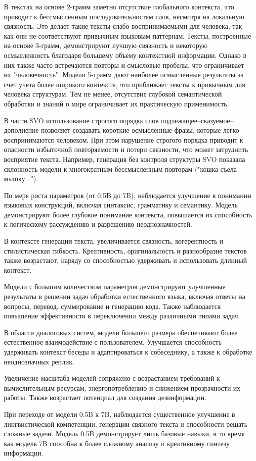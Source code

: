 В текстах на основе 2-грамм заметно отсутствие глобального контекста, что приводит к бессмысленным последовательностям слов, несмотря на локальную связность. 
Это делает такие тексты слабо воспринимаемыми для человека, так как они не соответствуют привычным языковым паттернам.
Тексты, построенные на основе 3-грамм, демонстрируют лучшую связность и некоторую осмысленность благодаря большему объему контекстной информации. 
Однако в них также часто встречаются повторы и смысловые пробелы, что ограничивает их "человечность". 
Модели 5-грамм дают наиболее осмысленные результаты за счет учета более широкого контекста, что приближает тексты к привычным для человека структурам. 
Тем не менее, отсутствие глубокой семантической обработки и знаний о мире ограничивает их практическую применимость.

В части SVO использование строгого порядка слов подлежащее–сказуемое–дополнение позволяет создавать короткие осмысленные фразы, которые легко воспринимаются человеком. 
При этом нарушение строгого порядка приводит к опасности избыточной повторяемости и потери связности, что может затруднить восприятие текста. 
Например, генерация без контроля структуры SVO показала склонность модели к многократным бессмысленным повторам ("кошка съела мышку..."). 

По мере роста параметров (от 0.5B до 7B), наблюдается улучшение в понимании языковых конструкций, включая синтаксис, грамматику и семантику. 
Модель демонстрируют более глубокое понимание контекста, повышается их способность к логическому рассуждению и разрешению неоднозначностей.

В контексте генерации текста, увеличивается связность, когерентность и стилистическая гибкость. 
Креативность, оригинальность и разнообразие текстов также возрастают, наряду со способностью удерживать и использовать длинный контекст.

Модели с большим количеством параметров демонстрируют улучшенные результаты в решении задач обработки естественного языка, 
включая ответы на вопросы, перевод, суммирование и генерацию кода. 
Также наблюдается повышение эффективности в переключении между различными типами задач.

В области диалоговых систем, модели большего размера обеспечивают более естественное взаимодействие с пользователем. 
Улучшается способность удерживать контекст беседы и адаптироваться к собеседнику, а также к обработке неоднозначных реплик.

Увеличение масштаба моделей сопряжено с возрастанием требований к вычислительным ресурсам, энергопотреблению и снижением прозрачности их работы. 
Также возрастает потенциал для создания дезинформации.

При переходе от модели 0.5B к 7B, наблюдается существенное улучшение в лингвистической компетенции, 
генерации связного текста и способности решать сложные задачи. 
Модель 0.5B демонстрирует лишь базовые навыки, в то время как модель 7B способна к более сложному анализу и креативному синтезу информации.

\clearpage

